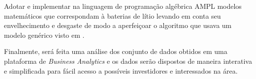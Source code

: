 Adotar e implementar na linguagem de programação algébrica AMPL modelos matemáticos que correspondam à baterias de lítio levando em conta seu envelhecimento e desgaste de modo a aperfeiçoar o algoritmo que usava um modelo genérico visto em \cite{salles2017}. 

Finalmente, será feita uma análise dos conjunto de dados obtidos em uma plataforma de \textit{Business Analytics} e os dados serão dispostos de maneira interativa e simplificada para fácil acesso a possíveis investidores e interessados na área. 







